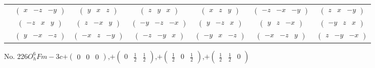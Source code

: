 \documentclass[fleqn,9pt,landscape]{jsarticle}
\begin{document}
\begin{center}
\begin{longtable}{ccccccc}
& $ \begin{pmatrix} x & - z & - y \end{pmatrix} $ & $ \begin{pmatrix} y & x & z \end{pmatrix} $ & $ \begin{pmatrix} z & y & x \end{pmatrix} $ & $ \begin{pmatrix} x & z & y \end{pmatrix} $ & $ \begin{pmatrix} - z & - x & - y \end{pmatrix} $ & $ \begin{pmatrix} z & x & - y \end{pmatrix} $ \\
& $ \begin{pmatrix} - z & x & y \end{pmatrix} $ & $ \begin{pmatrix} z & - x & y \end{pmatrix} $ & $ \begin{pmatrix} - y & - z & - x \end{pmatrix} $ & $ \begin{pmatrix} y & - z & x \end{pmatrix} $ & $ \begin{pmatrix} y & z & - x \end{pmatrix} $ & $ \begin{pmatrix} - y & z & x \end{pmatrix} $ \\
& $ \begin{pmatrix} y & - x & - z \end{pmatrix} $ & $ \begin{pmatrix} - x & z & - y \end{pmatrix} $ & $ \begin{pmatrix} - z & - y & x \end{pmatrix} $ & $ \begin{pmatrix} - y & x & - z \end{pmatrix} $ & $ \begin{pmatrix} - x & - z & y \end{pmatrix} $ & $ \begin{pmatrix} z & - y & - x \end{pmatrix} $ \\
\end{longtable}
\end{center}
\newpage
No. 226\quad$O_{h}^{6}$\quad$Fm-3c$\quad[ cubic ]\quad$+\begin{pmatrix} 0 & 0 & 0 \end{pmatrix}$,\quad $+\begin{pmatrix} 0 & \frac{1}{2} & \frac{1}{2} \end{pmatrix}$,\quad $+\begin{pmatrix} \frac{1}{2} & 0 & \frac{1}{2} \end{pmatrix}$,\quad $+\begin{pmatrix} \frac{1}{2} & \frac{1}{2} & 0 \end{pmatrix}$
\end{document}
